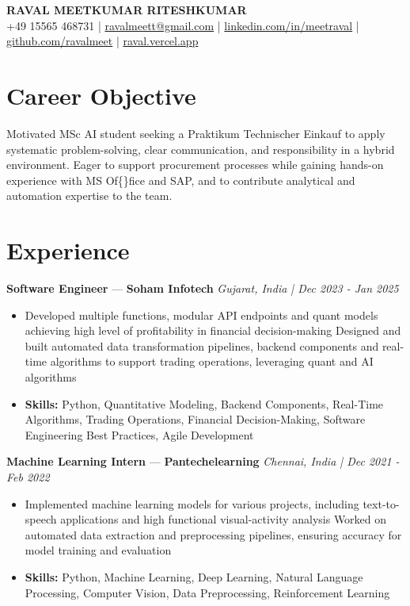 \documentclass[a4paper,10pt]{article}
\begin{document}
\begin{center}
  {\Large\bfseries RAVAL MEETKUMAR RITESHKUMAR}\\[2pt]
  {\small +49 15565 468731 \;|\; \href{mailto:ravalmeett@gmail.com}{ravalmeett@gmail.com} \;|\; \href{https://www.linkedin.com/in/meetraval/}{linkedin.com/in/meetraval} \;|\; \href{https://github.com/ravalmeet}{github.com/ravalmeet} \;|\; \href{https://raval.vercel.app/}{raval.vercel.app}}
\end{center}
\vspace{-3pt}

\section*{Career Objective}
Motivated MSc AI student seeking a Praktikum Technischer Einkauf to apply systematic problem-solving, clear communication, and responsibility in a hybrid environment. Eager to support procurement processes while gaining hands-on experience with MS Of\{\}fice and SAP, and to contribute analytical and automation expertise to the team.\par

\section*{Experience}
\textbf{Software Engineer} — \textbf{Soham Infotech} \hfill \textit{Gujarat, India \;|\; Dec 2023 - Jan 2025}\par
\vspace{1pt}
\begin{itemize}
  \item Developed multiple functions, modular API endpoints and quant models achieving high level of profitability in financial decision-making Designed and built automated data transformation pipelines, backend components and real-time algorithms to support trading operations, leveraging quant and AI algorithms
  \item \textbf{Skills:} Python, Quantitative Modeling, Backend Components, Real-Time Algorithms, Trading Operations, Financial Decision-Making, Software Engineering Best Practices, Agile Development
\end{itemize}
\vspace{3pt}
\textbf{Machine Learning Intern} — \textbf{Pantechelearning} \hfill \textit{Chennai, India \;|\; Dec 2021 - Feb 2022}\par
\vspace{1pt}
\begin{itemize}
  \item Implemented machine learning models for various projects, including text-to-speech applications and high functional visual-activity analysis Worked on automated data extraction and preprocessing pipelines, ensuring accuracy for model training and evaluation
  \item \textbf{Skills:} Python, Machine Learning, Deep Learning, Natural Language Processing, Computer Vision, Data Preprocessing, Reinforcement Learning
\end{itemize}
\end{document}
